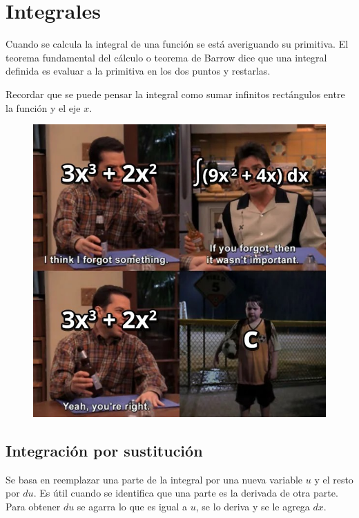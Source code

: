 \section{Integrales}

\begin{multicols}{2}
Cuando se calcula la integral de una función se está averiguando su primitiva. El teorema fundamental del cálculo o teorema de Barrow dice que una integral definida es evaluar a la primitiva en los dos puntos y restarlas.

Recordar que se puede pensar la integral como sumar infinitos rectángulos entre la función y el eje $x$.
\vfill
\null

\begin{figure}[H]
    \centering
    \includegraphics[width=0.9\linewidth]{Images/meme_integrales.jpg}
\end{figure}
\end{multicols}

\subsection*{Integración por sustitución}

Se basa en reemplazar una parte de la integral por una nueva variable $u$ y el resto por $du$. Es útil cuando se identifica que una parte es la derivada de otra parte. Para obtener $du$ se agarra lo que es igual a $u$, se lo deriva y se le agrega $dx$.
\skipline 

